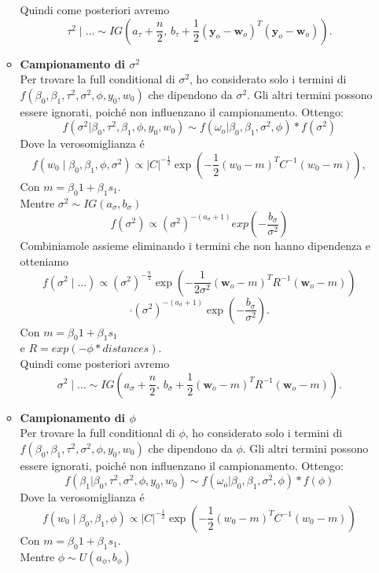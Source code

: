 \documentclass[a4paper,12pt]{article}
\begin{document}
\begin{itemize}
\begin{itemize}
			Quindi come posteriori avremo
			\[
			\tau^2 \mid \dots \sim IG \left( a_\tau + \frac{n}{2}, \, b_\tau + \frac{1}{2} (\mathbf{y}_o - \mathbf{w}_o)^T (\mathbf{y}_o - \mathbf{w}_o) \right).
			\]
			\item \textbf{Campionamento di $\sigma^2$}\\
			Per trovare la full conditional di \( \sigma^2 \), ho considerato solo i termini di \( f(\beta_0,\beta_1,\tau^2,\sigma^2,\phi , y_0,w_0) \) che dipendono da \( \sigma^2 \). Gli altri termini possono essere ignorati, poiché non influenzano il campionamento. Ottengo:
			\[
			f(\sigma^2|\beta_0,\tau^2,\beta_1,\phi , y_0,w_0) \sim f(\omega_o | \beta_0,\beta_1,\sigma^2,\phi)*f(\sigma^2)
			\]
			Dove la verosomiglianza é
			\[
			f(w_0 \mid \beta_0, \beta_1, \phi, \sigma^2) \propto |C|^{-\frac{1}{2}} \exp \left( -\frac{1}{2} (w_0 - m )^T C^{-1} (w_0 - m) \right),
			\]
			Con $m=\beta_0 1 + \beta_1 s_1$.\\
			Mentre $\sigma^2 \sim IG(a_{\sigma},b_{\sigma})$
			\[
			f(\sigma^2) \propto (\sigma^2)^{-(a_{\sigma}+1)} exp(-\frac{b_{\sigma}}{\sigma^2})
			\]
			Combiniamole assieme eliminando i termini che non hanno dipendenza e otteniamo
			\[
			f(\sigma^2 \mid \dots) \propto (\sigma^2)^{-\frac{n}{2}} 
			\exp \left( -\frac{1}{2 \sigma^2} (\mathbf{w}_o - m)^T R^{-1} (\mathbf{w}_o - m) \right)
			\]
			\[
			\cdot (\sigma^2)^{-(a_\sigma + 1)} \exp \left( -\frac{b_\sigma}{\sigma^2} \right).
			\]
			Con $m=\beta_0 1 + \beta_1 s_1$\\
			e $R=exp(-\phi*distances)$.\\
			Quindi come posteriori avremo
			\[
			\sigma^2 \mid \dots \sim IG \left( 
			a_\sigma + \frac{n}{2}, \, 
			b_\sigma + \frac{1}{2} (\mathbf{w}_o - m)^T R^{-1} (\mathbf{w}_o - m)
			\right).
			\]
			\item \textbf{Campionamento di $\phi$}\\
			Per trovare la full conditional di \( \phi \), ho considerato solo i termini di \( f(\beta_0,\beta_1,\tau^2,\sigma^2,\phi , y_0,w_0) \) che dipendono da \( \phi \). Gli altri termini possono essere ignorati, poiché non influenzano il campionamento. Ottengo:
			\[
			f(\beta_1|\beta_0,\tau^2,\sigma^2,\phi , y_0,w_0) \sim f(\omega_o | \beta_0,\beta_1,\sigma^2,\phi)*f(\phi)
			\]
			Dove la verosomiglianza é
			\[
			f(w_0 \mid \beta_0, \beta_1, \phi) \propto |C|^{-\frac{1}{2}} \exp \left( -\frac{1}{2} (w_0 - m )^T C^{-1} (w_0 - m) \right)
			\]
			Con $m=\beta_0 1 + \beta_1 s_1$.\\
			Mentre $\phi \sim U(a_{\phi},b_{\phi})$

\end{itemize}
\end{itemize}
\end{document}

